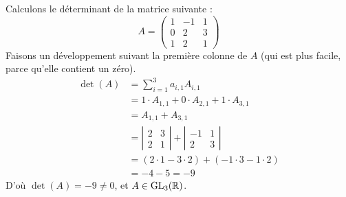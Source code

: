 \documentclass[12pt, a4paper]{report}
\begin{document}
\begin{example}
    Calculons le déterminant de la matrice suivante :
    $$A = \left(\begin{matrix}
    1 & -1 & 1 \\
    0 & 2 & 3 \\
    1 & 2 & 1
    \end{matrix}\right)$$
    Faisons un développement suivant la première colonne de $A$ (qui est plus facile, parce qu'elle contient un zéro).
    \begin{align*}
        \det(A) &= \sum_{i=1}^{3} a_{i,1} A_{i,1} \\
                &= 1 \cdot A_{1,1} + 0 \cdot A_{2,1} + 1 \cdot A_{3,1} \\
                &= A_{1,1} + A_{3,1} \\
                &= \left|\begin{matrix}
                2 & 3 \\
                2 & 1
                \end{matrix}\right| + \left|\begin{matrix}
                -1 & 1 \\
                2 & 3
                \end{matrix}\right| \\
                &= (2 \cdot 1 - 3 \cdot 2) + (-1 \cdot 3 - 1 \cdot 2) \\
                &= -4 - 5 = -9
    \end{align*}
    D'où $\det(A) = -9 \ne 0$, et $A \in \mathrm{GL}_3(\mathbb{R})$.
\end{example}
\end{document}
